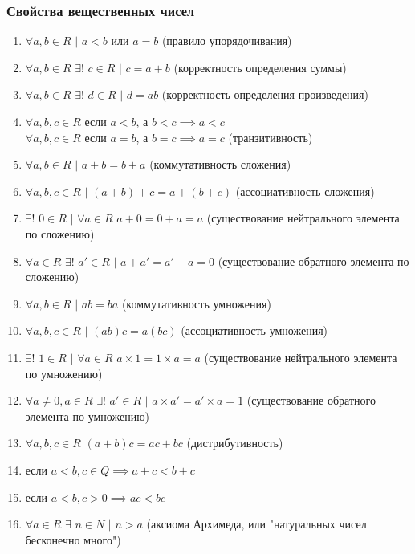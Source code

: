 \documentclass[12pt]{article}
\begin{document}
    \subsubsection*{Свойства вещественных чисел}
    \begin{enumerate}
        \item $\forall a,b \in R$ $|$ $a < b$ или $a = b$ (правило упорядочивания)
        \item $\forall a,b \in R$ $\exists!$ $c \in R$ $|$ $ c = a + b$ (корректность определения суммы)
        \item $\forall a,b \in R$ $\exists!$ $d \in R$ $|$ $ d = ab$ (корректность определения произведения)
        \item $\forall a,b,c \in R$ если $a < b$, а $b < c \implies a < c$\\$\forall a,b,c \in R$ если $a = b$, а $b = c \implies a = c$ (транзитивность)
        \item $\forall a,b \in R$ $|$ $a+b=b+a$ (коммутативность сложения)
        \item $\forall a,b,c \in R$ $|$ $(a+b)+c = a+(b+c)$ (ассоциативность сложения)
        \item $\exists!$ $0 \in R$ $|$ $\forall a \in R$ $a+0 = 0+a = a$ (существование нейтрального элемента по сложению)
        \item $\forall a \in R$ $\exists!$ $a' \in R$ $|$ $a+a'=a'+a = 0$ (существование обратного элемента по сложению)
        \item $\forall a,b \in R$ $|$ $ab=ba$ (коммутативность умножения)
        \item $\forall a,b,c \in R$ $|$ $(ab)c = a(bc)$ (ассоциативность умножения)
        \item $\exists!$ $1 \in R$ $|$ $\forall a \in R$ $a \times 1 = 1 \times a = a$ (существование нейтрального элемента по умножению)
        \item $\forall a \ne 0, a \in R$ $\exists!$ $a' \in R$ $|$ $a \times a'=a' \times a = 1$ (существование обратного элемента по умножению)
        \item $\forall a,b,c \in R$ $(a + b)c = ac + bc$ (дистрибутивность)
        \item если $a < b, c \in Q \implies a+c < b+c$
        \item если $a < b, c > 0 \implies ac < bc$
        \item $\forall a \in R$ $\exists$ $n \in N$ $|$ $n > a$ (аксиома Архимеда, или "натуральных чисел бесконечно много")
    \end{enumerate}
\end{document}
